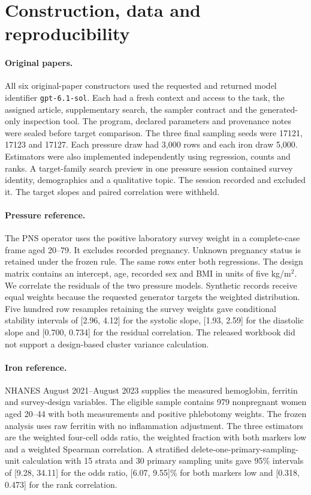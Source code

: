 \section{Construction, data and reproducibility}
\label{app:design}
\paragraph{Original papers.}
All six original-paper constructors used the requested and returned model identifier \texttt{gpt-6.1-sol}. Each had a fresh context and access to the task, the assigned article, supplementary search, the sampler contract and the generated-only inspection tool. The program, declared parameters and provenance notes were sealed before target comparison. The three final sampling seeds were 17121, 17123 and 17127. Each pressure draw had 3,000 rows and each iron draw 5,000. Estimators were also implemented independently using regression, counts and ranks. A target-family search preview in one pressure session contained survey identity, demographics and a qualitative topic. The session recorded and excluded it. The target slopes and paired correlation were withheld.

\paragraph{Pressure reference.}
The PNS operator uses the positive laboratory survey weight in a complete-case frame aged 20--79. It excludes recorded pregnancy. Unknown pregnancy status is retained under the frozen rule. The same rows enter both regressions. The design matrix contains an intercept, age, recorded sex and BMI in units of five kg/m$^2$. We correlate the residuals of the two pressure models. Synthetic records receive equal weights because the requested generator targets the weighted distribution. Five hundred row resamples retaining the survey weights gave conditional stability intervals of [2.96, 4.12] for the systolic slope, [1.93, 2.59] for the diastolic slope and [0.700, 0.734] for the residual correlation. The released workbook did not support a design-based cluster variance calculation.

\paragraph{Iron reference.}
NHANES August 2021--August 2023 supplies the measured hemoglobin, ferritin and survey-design variables. The eligible sample contains 979 nonpregnant women aged 20--44 with both measurements and positive phlebotomy weights. The frozen analysis uses raw ferritin with no inflammation adjustment. The three estimators are the weighted four-cell odds ratio, the weighted fraction with both markers low and a weighted Spearman correlation. A stratified delete-one-primary-sampling-unit calculation with 15 strata and 30 primary sampling units gave 95\% intervals of [9.28, 34.11] for the odds ratio, [6.07, 9.55]\% for both markers low and [0.318, 0.473] for the rank correlation.

